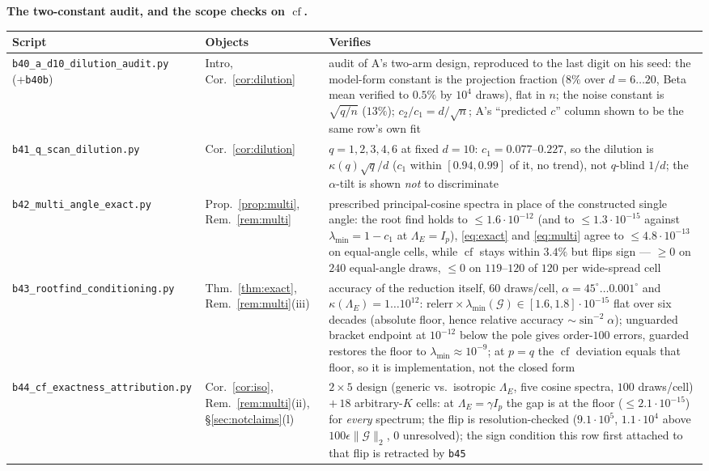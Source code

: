 \documentclass[11pt]{article}
\theoremstyle{remark}
\newcommand{\Gr}{\mathcal{G}}
\newcommand{\Le}{\Lambda_E}
\begin{document}
\noindent\textbf{The two-constant audit, and the scope checks on $\operatorname{cf}$.}
\begin{center}\footnotesize\begin{tabular}{@{}>{\raggedright\arraybackslash}p{5.1cm}%
>{\raggedright\arraybackslash}p{2.5cm}>{\raggedright\arraybackslash}p{5.8cm}@{}}
\toprule Script & Objects & Verifies\\
\midrule
\texttt{b40\_a\_d10\_dilution\_audit.py} (+\texttt{b40b}) &
Intro, Cor.~\ref{cor:dilution} & audit of A's two-arm design, reproduced to the last digit on
his seed: the model-form constant is the projection fraction ($8\%$ over $d=6\ldots20$, Beta
mean verified to $0.5\%$ by $10^4$ draws), flat in $n$; the noise constant is $\sqrt{q/n}$
($13\%$); $c_2/c_1=d/\sqrt n$; A's ``predicted $c$'' column shown to be the same row's own fit\\
\texttt{b41\_q\_scan\_dilution.py} & Cor.~\ref{cor:dilution} & $q=1,2,3,4,6$ at fixed $d=10$:
$c_1=0.077$--$0.227$, so the dilution is $\kappa(q)\sqrt q/d$ ($c_1$ within $[0.94,0.99]$ of it,
no trend), not $q$-blind $1/d$; the $\alpha$-tilt is shown \emph{not} to discriminate\\
\texttt{b42\_multi\_angle\_exact.py} & Prop.~\ref{prop:multi}, Rem.~\ref{rem:multi} &
prescribed principal-cosine spectra in place of the constructed single angle: the root find holds
to $\le1.6\cdot10^{-12}$ (and to $\le1.3\cdot10^{-15}$ against $\lambda_{\min}=1-c_1$ at $\Le=I_p$),
\eqref{eq:exact} and \eqref{eq:multi} agree to $\le4.8\cdot10^{-13}$ on equal-angle cells, while
$\operatorname{cf}$ stays within $3.4\%$ but flips sign --- $\ge0$ on $240$ equal-angle draws,
$\le0$ on $119$--$120$ of $120$ per wide-spread cell\\
\texttt{b43\_rootfind\_conditioning.py} & Thm.~\ref{thm:exact}, Rem.~\ref{rem:multi}(iii) &
accuracy of the reduction itself, $60$ draws/cell, $\alpha=45^\circ\ldots0.001^\circ$ and
$\kappa(\Le)=1\ldots10^{12}$: $\mathrm{relerr}\times\lambda_{\min}(\Gr)\in[1.6,1.8]\cdot10^{-15}$ flat
over six decades (absolute floor, hence relative accuracy $\sim\sin^{-2}\alpha$); unguarded bracket
endpoint at $10^{-12}$ below the pole gives order-$100$ errors, guarded restores the floor to
$\lambda_{\min}\approx10^{-9}$; at $p=q$ the $\operatorname{cf}$ deviation equals that floor, so it is
implementation, not the closed form\\
\texttt{b44\_cf\_exactness\_attribution.py} & Cor.~\ref{cor:iso}, Rem.~\ref{rem:multi}(ii),
\S\ref{sec:notclaims}(l) & $2\times5$ design (generic vs.\ isotropic $\Le$, five cosine spectra,
$100$ draws/cell) $+\,18$ arbitrary-$K$ cells: at $\Le=\gamma I_p$ the gap is at the floor
($\le2.1\cdot10^{-15}$) for \emph{every} spectrum; the flip is resolution-checked
($9.1\cdot10^{5}$, $1.1\cdot10^{4}$ above $100\epsilon\|\Gr\|_2$, $0$ unresolved); the sign
condition this row first attached to that flip is retracted by \texttt{b45}\\
\end{tabular}\end{center}
\end{document}
